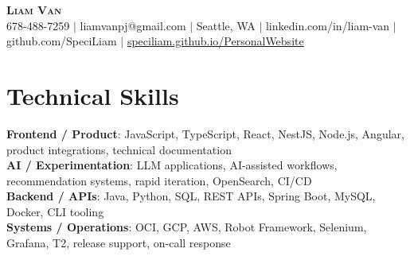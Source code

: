 \documentclass[letterpaper,11pt]{article}
\begin{document}

%
\begin{center}
    \textbf{\Huge \scshape Liam Van} \\ \vspace{1pt}
    \small 678-488-7259 $|$ \small {liamvanpj@gmail.com} $|$ Seattle, WA
 {{$|$ linkedin.com/in/liam-van} {$|$ github.com/SpeciLiam} {$|$ \href{https://speciliam.github.io/PersonalWebsite}{speciliam.github.io/PersonalWebsite}}}

\end{center}

\section{Technical Skills}
 \begin{itemize}[leftmargin=0.15in, label={}]
    \small{\item{
     \textbf{Frontend / Product}{: JavaScript, TypeScript, React, NestJS, Node.js, Angular, product integrations, technical documentation} \\
     \textbf{AI / Experimentation}{: LLM applications, AI-assisted workflows, recommendation systems, rapid iteration, OpenSearch, CI/CD} \\
     \textbf{Backend / APIs}{: Java, Python, SQL, REST APIs, Spring Boot, MySQL, Docker, CLI tooling} \\
     \textbf{Systems / Operations}{: OCI, GCP, AWS, Robot Framework, Selenium, Grafana, T2, release support, on-call response} \\
    }}
 \end{itemize}
%
\end{document}
